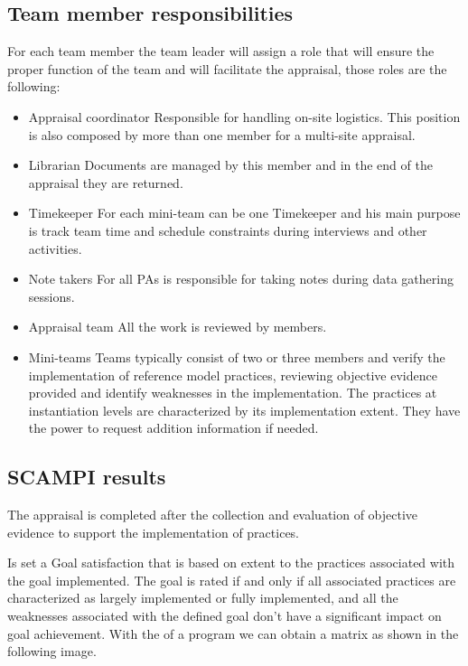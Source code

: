 \subsection{Team member responsibilities}
For each team member the team leader will assign a role that will ensure the proper function of the team and will facilitate the appraisal, those roles are the following:
\begin{itemize}
	\item Appraisal coordinator
	\subitem Responsible for handling on-site logistics. This position is also composed by more than one member for a multi-site appraisal.
	\item Librarian
	\subitem Documents are managed by this member and in the end of the appraisal they are returned.
	\item Timekeeper
	\subitem For each mini-team can be one Timekeeper and his main purpose is track team time and schedule constraints during interviews and other activities.
	\item Note takers
	\subitem For all PAs is responsible for taking notes during data gathering sessions.
	\item Appraisal team
	\subitem All the work is reviewed by members.
	\item Mini-teams
	\subitem Teams typically consist of two or three members and verify the implementation of reference model practices, reviewing objective evidence provided and identify weaknesses in the implementation. The practices at instantiation levels are characterized by its implementation extent. They have the power to request addition information if needed. 
\end{itemize}

\subsection{SCAMPI results}

The appraisal is completed after the collection and evaluation of objective evidence to support the implementation of practices.

Is set a Goal satisfaction that is based on extent to the practices associated with the goal implemented. The goal is rated if and only if all associated practices are characterized as largely implemented or fully implemented, and all the weaknesses associated with the defined goal don't have a significant impact on goal achievement.
With the of a program we can obtain a matrix as shown in the following image.
 
